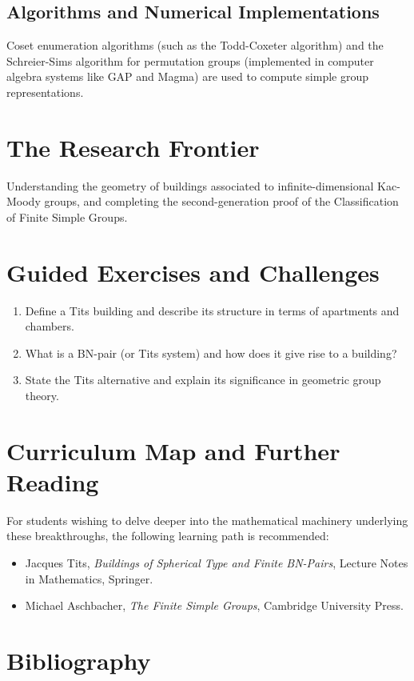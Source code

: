 \subsection{Algorithms and Numerical Implementations}
Coset enumeration algorithms (such as the Todd-Coxeter algorithm) and the Schreier-Sims algorithm for permutation groups (implemented in computer algebra systems like GAP and Magma) are used to compute simple group representations.

\section{The Research Frontier}
Understanding the geometry of buildings associated to infinite-dimensional Kac-Moody groups, and completing the second-generation proof of the Classification of Finite Simple Groups.

\section{Guided Exercises and Challenges}
\begin{enumerate}[label=\textbf{\arabic*.}]
  \item Define a Tits building and describe its structure in terms of apartments and chambers.
  \item What is a BN-pair (or Tits system) and how does it give rise to a building?
  \item State the Tits alternative and explain its significance in geometric group theory.
\end{enumerate}

\section{Curriculum Map and Further Reading}
For students wishing to delve deeper into the mathematical machinery underlying these breakthroughs, the following learning path is recommended:
\begin{itemize}
  \item Jacques Tits, \emph{Buildings of Spherical Type and Finite BN-Pairs}, Lecture Notes in Mathematics, Springer.
  \item Michael Aschbacher, \emph{The Finite Simple Groups}, Cambridge University Press.
\end{itemize}

\section*{Bibliography}

